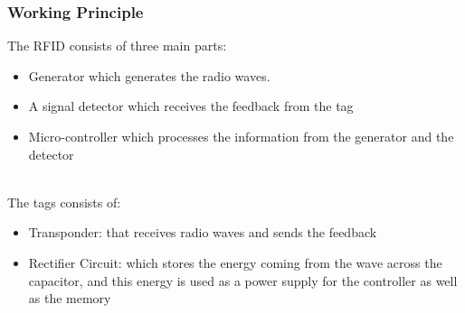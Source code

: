 \subsubsection{Working Principle}
The RFID consists of three main parts:
	\begin{itemize}
		\item Generator which generates the radio waves.
		\item A signal detector which receives the feedback from the tag
		\item Micro-controller which processes the information from the generator and the detector\\
		\\
	\end{itemize}
The tags consists of:
	\begin{itemize}
		\item Transponder: that receives radio waves and sends the feedback
		\item Rectifier Circuit: which stores the energy coming from the wave across the capacitor, and this energy is used as a power supply for the controller as well as the memory
	\end{itemize}

